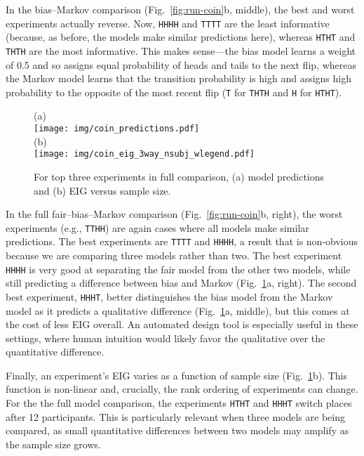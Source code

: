 \documentclass[10pt,letterpaper]{article}
\begin{document}
In the bias--Markov comparison (Fig.~\ref{fig:run-coin}b, middle), the best and worst experiments actually reverse.
Now, \lstinline{HHHH} and \lstinline{TTTT} are the least informative (because, as before, the models make similar predictions here), whereas \lstinline{HTHT} and \lstinline{THTH} are the most informative.
This makes sense---the bias model learns a weight of 0.5 and so assigns equal probability of heads and tails to the next flip, whereas the Markov model learns that the transition probability is high and assigns high probability to the opposite of the most recent flip (\lstinline{T} for \lstinline{THTH} and \lstinline{H} for \lstinline{HTHT}).

\begin{figure}[t]
            (a) \\ \texttt{[image: img/coin\_predictions.pdf]}\\ (b) \\ \texttt{[image: img/coin\_eig\_3way\_nsubj\_wlegend.pdf]}
  \caption{For top three experiments in full comparison, (a) model predictions and (b) EIG versus sample size.}
  \label{fig:coin_preds}
\end{figure}

In the full fair--bias--Markov comparison (Fig.~\ref{fig:run-coin}b, right), the worst experiments (e.g., \lstinline{TTHH}) are again cases where all models make similar predictions.
The best experiments are \lstinline{TTTT} and \lstinline{HHHH}, a result that is non-obvious because we are comparing three models rather than two.
The best experiment \lstinline{HHHH} is very good at separating the fair model from the other two models, while still predicting a difference between bias and Markov (Fig.~\ref{fig:coin_preds}a, right).
The second best experiment, \lstinline{HHHT}, better distinguishes the bias model from the Markov model as it predicts a qualitative difference (Fig.~\ref{fig:coin_preds}a, middle), but this comes at the cost of less EIG overall.
An automated design tool is especially useful in these settings, where human intuition would likely favor the qualitative over the quantitative difference.

Finally, an experiment's EIG varies as a function of sample size (Fig.~\ref{fig:coin_preds}b).
This function is non-linear and, crucially, the rank ordering of experiments can change.
For the the full model comparison, the experiments \lstinline{HTHT} and \lstinline{HHHT} switch places after 12 participants.
This is particularly relevant when three models are being compared, as small quantitative differences between two models may amplify as the sample size grows.
\end{document}
